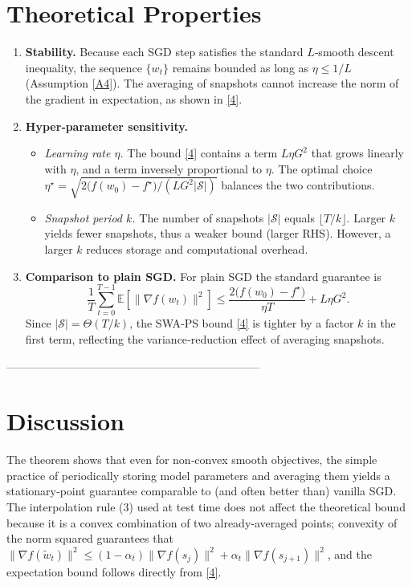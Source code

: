 \documentclass{article}
\newcommand{\E}{\mathbb{E}}
\begin{document}
\section*{Theoretical Properties}
\begin{enumerate}[label=\textbf{P\arabic*.}]
\item \textbf{Stability.} Because each SGD step satisfies the standard $L$‑smooth descent inequality, the sequence $\{w_t\}$ remains bounded as long as $\eta\le 1/L$ (Assumption \ref{A4}). The averaging of snapshots cannot increase the norm of the gradient in expectation, as shown in \eqref{4}.

\item \textbf{Hyper‑parameter sensitivity.}
\begin{itemize}
\item \emph{Learning rate $\eta$.} The bound \eqref{4} contains a term $L\eta G^{2}$ that grows linearly with $\eta$, and a term inversely proportional to $\eta$. The optimal choice $\eta^{\star}= \sqrt{2\bigl(f(w_0)-f^{\star}\bigr)/(L G^{2} |\mathcal{S}|)}$ balances the two contributions.
\item \emph{Snapshot period $k$.} The number of snapshots $|\mathcal{S}|$ equals $\lfloor T/k\rfloor$. Larger $k$ yields fewer snapshots, thus a weaker bound (larger RHS). However, a larger $k$ reduces storage and computational overhead.
\end{itemize}
\item \textbf{Comparison to plain SGD.} For plain SGD the standard guarantee is
\[
\frac{1}{T}\sum_{t=0}^{T-1}\E\!\left[\|\nabla f(w_t)\|^{2}\right]\le
\frac{2\bigl(f(w_0)-f^{\star}\bigr)}{\eta T}+L\eta G^{2}.
\]
Since $|\mathcal{S}| = \Theta(T/k)$, the SWA‑PS bound \eqref{4} is tighter by a factor $k$ in the first term, reflecting the variance‑reduction effect of averaging snapshots.

\end{enumerate}

--------------------------------------------------------------------

\section*{Discussion}
The theorem shows that even for non‑convex smooth objectives, the simple practice of periodically storing model parameters and averaging them yields a stationary‑point guarantee comparable to (and often better than) vanilla SGD. The interpolation rule (3) used at test time does not affect the theoretical bound because it is a convex combination of two already‑averaged points; convexity of the norm squared guarantees that $\|\nabla f(\tilde w_t)\|^{2}\le (1-\alpha_t)\|\nabla f(s_j)\|^{2}+\alpha_t\|\nabla f(s_{j+1})\|^{2}$, and the expectation bound follows directly from \eqref{4}.
\end{document}
